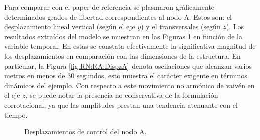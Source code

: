 Para comparar con el paper de referencia se plasmaron gráficamente determinados grados de libertad correspondientes al nodo A. Estos son: el desplazamiento lineal vertical (según el eje $y$) y el transversales (según $z$). Los resultados extraídos del modelo se muestran en las Figuras \ref{fig:RN:RA:DispsA} en función de la variable temporal. En estas se constata efectivamente la significativa magnitud de los desplazamientos en comparación con las dimensiones de la estructura. En particular, la Figura \ref{fig:RN:RA:DispzA} denota oscilaciones que alcanzan varios metros en menos de 30 segundos, esto muestra el carácter exigente en términos dinámicos del ejemplo. Con respecto a este movimiento no armónico  de vaivén en el eje $z$, se puede notar la presencia no conservativa de la formulación corrotacional, ya que las amplitudes prestan una tendencia atenuante con el tiempo.  

\begingroup
\centering
\begin{figure}[htbp]
	\centering
	\caption{Desplazamientos de control del nodo A.} \label{fig:RN:RA:DispsA}
\end{figure}
\endgroup

